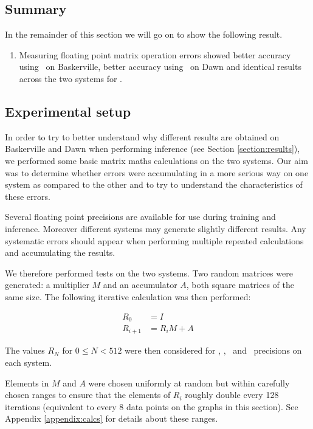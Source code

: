 \subsection{Summary}

In the remainder of this section we will go on to show the following result.

\begin{enumerate}
    \item Measuring floating point matrix operation errors showed better accuracy using \fpsingle\ on Baskerville, better accuracy using \fphalf\ on Dawn and identical results across the two systems for \bfhalf.
\end{enumerate}

\subsection{Experimental setup}

In order to try to better understand why different results are obtained on Baskerville and Dawn when performing inference (see Section \ref{section:results}), we performed some basic matrix maths calculations on the two systems. Our aim was to determine whether errors were accumulating in a more serious way on one system as compared to the other and to try to understand the characteristics of these errors.

Several floating point precisions are available for use during training and inference. Moreover different systems may generate slightly different results. Any systematic errors should appear when performing multiple repeated calculations and accumulating the results.

We therefore performed tests on the two systems. Two random matrices were generated: a multiplier $M$ and an accumulator $A$, both square matrices of the same size. The following iterative calculation was then performed:

\begin{align*}
R_0 &= I \\
R_{i + 1} &= R_i M + A
\end{align*}

The values $R_N$ for $0 \le N < 512$ were then considered for \fpdouble, \fpsingle, \fphalf\ and \bfhalf\ precisions on each system.

Elements in $M$ and $A$ were chosen uniformly at random but within carefully chosen ranges to ensure that the elements of $R_i$ roughly double every 128 iterations (equivalent to every 8 data points on the graphs in this section). See Appendix \ref{appendix:calcs} for details about these ranges.

